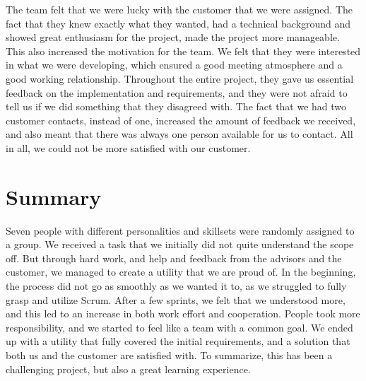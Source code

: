 The team felt that we were lucky with the customer that we were assigned.
The fact that they knew exactly what they wanted, had a technical background and showed great enthusiasm for the project, made the project more manageable. This also increased the motivation for the team. We felt that they were interested in what we were developing, which ensured a good meeting atmosphere and a good working relationship. Throughout the entire project, they gave us essential feedback on the implementation and requirements, and they were not afraid to tell us if we did something that they disagreed with. The fact that we had two customer contacts, instead of one, increased the amount of feedback we received, and also meant that there was always one person available for us to contact. All in all, we could not be more satisfied with our customer.


\section{Summary}
Seven people with different personalities and skillsets were randomly assigned to a group. We received a task that we initially did not quite understand the scope off.
But through hard work, and help and feedback from the advisors and the customer, we managed to create a utility that we are proud of. In the beginning, the process did not go as smoothly as we wanted it to, as we struggled to fully grasp and utilize Scrum. After a few sprints, we felt that we understood more, and this led to an increase in both work effort and cooperation. People took more responsibility, and we started to feel like a team with a common goal. We ended up with a utility that fully covered the initial requirements, and a solution that both us and the customer are satisfied with. To summarize, this has been a challenging project, but also a great learning experience.


